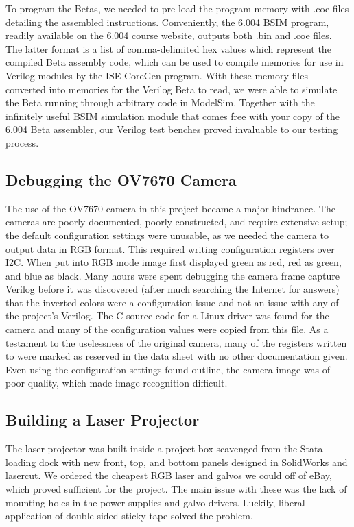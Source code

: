 \documentclass{article}
\begin{document}
To program the Betas, we needed to pre-load the program memory with .coe files detailing the assembled instructions. Conveniently, the 6.004 BSIM program, readily available on the 6.004 course website, outputs both .bin and .coe files. The latter format is a list of comma-delimited hex values which represent the compiled Beta assembly code, which can be used to compile memories for use in Verilog modules by the ISE CoreGen program. With these memory files converted into memories for the Verilog Beta to read, we were able to simulate the Beta running through arbitrary code in ModelSim. Together with the infinitely useful BSIM simulation module that comes free with your copy of the 6.004 Beta assembler, our Verilog test benches proved invaluable to our testing process.

\subsection{Debugging the OV7670 Camera} \label{camerasuck}

The use of the OV7670 camera in this project became a major hindrance. The cameras are poorly documented, poorly constructed, and require extensive setup; the default configuration settings were unusable, as we needed the camera to output data in RGB format. This required writing configuration registers over I2C. When put into RGB mode image first displayed green as red, red as green, and blue as black. Many hours were spent debugging the camera frame capture Verilog before it was discovered (after much searching the Internet for answers) that the inverted colors were a configuration issue and not an issue with any of the project's Verilog. The C source code for a Linux driver was found for the camera and many of the configuration values were copied from this file. As a testament to the uselessness of the original camera, many of the registers written to were marked as reserved in the data sheet with no other documentation given. Even using the configuration settings found outline, the camera image was of poor quality, which made image recognition difficult.

\subsection{Building a Laser Projector} \label{laserbox}

The laser projector was built inside a project box scavenged from the Stata loading dock with new front, top, and bottom panels designed in SolidWorks and lasercut. We ordered the cheapest RGB laser and galvos we could off of eBay, which proved sufficient for the project. The main issue with these was the lack of mounting holes in the power supplies and galvo drivers. Luckily, liberal application of double-sided sticky tape solved the problem. 
\end{document}
